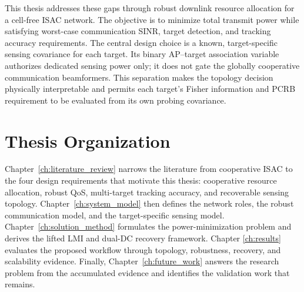 This thesis addresses these gaps through robust downlink resource allocation
for a cell-free ISAC network. The objective is to minimize total transmit power
while satisfying worst-case communication SINR, target detection, and tracking
accuracy requirements. The central design choice is a known,
target-specific sensing covariance for each target. Its binary AP--target
association variable authorizes dedicated sensing power only; it does not gate
the globally cooperative communication beamformers. This separation makes the
topology decision physically interpretable and permits each target's Fisher
information and PCRB requirement to be evaluated from its own probing
covariance.

\section{Thesis Organization}

Chapter~\ref{ch:literature_review} narrows the literature from cooperative
ISAC to the four design requirements that motivate this thesis: cooperative
resource allocation, robust QoS, multi-target tracking accuracy, and
recoverable sensing topology. Chapter~\ref{ch:system_model} then defines the
network roles, the robust communication model, and the target-specific sensing
model. Chapter~\ref{ch:solution_method} formulates the power-minimization
problem and derives the lifted LMI and dual-DC recovery framework. Chapter
\ref{ch:results} evaluates the proposed workflow through topology, robustness,
recovery, and scalability evidence. Finally,
Chapter~\ref{ch:future_work} answers the research problem from the accumulated
evidence and identifies the validation work that remains.
